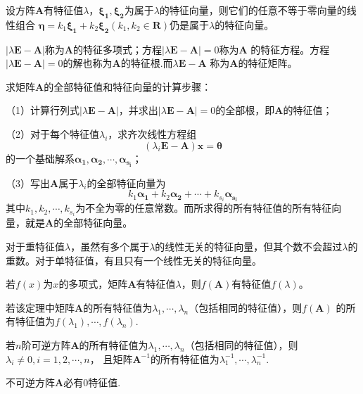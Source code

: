\begin{theorem}
    设方阵$\boldsymbol{A}$有特征值$\lambda$，$\boldsymbol{\xi_1},\boldsymbol{\xi_2}$为属于$\lambda$的特征向量，则它们的任意不等于零向量的线性组合
    $\boldsymbol{\eta}=k_1\boldsymbol{\xi_1}+k_2\boldsymbol{\xi_2}(k_1,k_2\in \mathbf{R})$仍是属于$\lambda$的特征向量。
\end{theorem}

\begin{definition}
    $|\lambda\boldsymbol{E}-\boldsymbol{A}|$称为$\boldsymbol{A}$的{\heiti 特征多项式}；方程$|\lambda\boldsymbol{E}-\boldsymbol{A}|=0$称为$\boldsymbol{A}$
    的{\heiti 特征方程}。方程$|\lambda\boldsymbol{E}-\boldsymbol{A}|=0$的解也称为$\boldsymbol{A}$的{\heiti 特征根}.而$\lambda\boldsymbol{E}-\boldsymbol{A}$
    称为$\boldsymbol{A}$的{\heiti 特征矩阵}。
\end{definition}


\begin{theorem}
    求矩阵$\boldsymbol{A}$的全部特征值和特征向量的计算步骤：

    （1）计算行列式$|\lambda\boldsymbol{E}-\boldsymbol{A}|$，并求出$|\lambda\boldsymbol{E}-\boldsymbol{A}|=0$的全部根，即$\boldsymbol{A}$的特征值；
    
    （2）对于每个特征值$\lambda_i$，求齐次线性方程组$$(\lambda_i\boldsymbol{E}-\boldsymbol{A})\boldsymbol{x}=\boldsymbol{\theta}$$的一个基础解系$\boldsymbol{\alpha_1},\boldsymbol{\alpha_2},\cdots,\boldsymbol{\alpha_{s_i}}$；

    （3）写出$\boldsymbol{A}$属于$\lambda_i$的全部特征向量为$$k_1\boldsymbol{\alpha_1}+k_2\boldsymbol{\alpha_2}+\cdots+k_{s_i}\boldsymbol{\alpha_{s_i}}$$
    其中$k_1,k_2,\cdots,k_{s_i}$为不全为零的任意常数。而所求得的所有特征值的所有特征向量，就是$\boldsymbol{A}$的全部特征向量。
\end{theorem}

\begin{remark}
    对于重特征值$\lambda$，虽然有多个属于$\lambda$的线性无关的特征向量，但其个数不会超过$\lambda$的重数。对于单特征值，有且只有一个线性无关的特征向量。
\end{remark}

\begin{theorem}
    若$f(x)$为$x$的多项式，矩阵$\boldsymbol{A}$有特征值$\lambda$，则$f(\boldsymbol{A})$有特征值$f(\lambda)$。
\end{theorem}
\begin{remark}
    若该定理中矩阵$\boldsymbol{A}$的所有特征值为$\lambda_1,\cdots,\lambda_n$（包括相同的特征值），则$f(\boldsymbol{A})$
    的所有特征值为$f(\lambda_1),\cdots,f(\lambda_n)$.
\end{remark}
\begin{remark}
    若$n$阶可逆方阵$\boldsymbol{A}$的所有特征值为$\lambda_1,\cdots,\lambda_n$（包括相同的特征值），则$\lambda_i\neq 0,i=1,2,\cdots,n$，
    且矩阵$\boldsymbol{A}^{-1}$的所有特征值为$\lambda_1^{-1},\cdots,\lambda_n^{-1}$.
\end{remark}
\begin{remark}
    不可逆方阵$\boldsymbol{A}$必有0特征值.
\end{remark}


